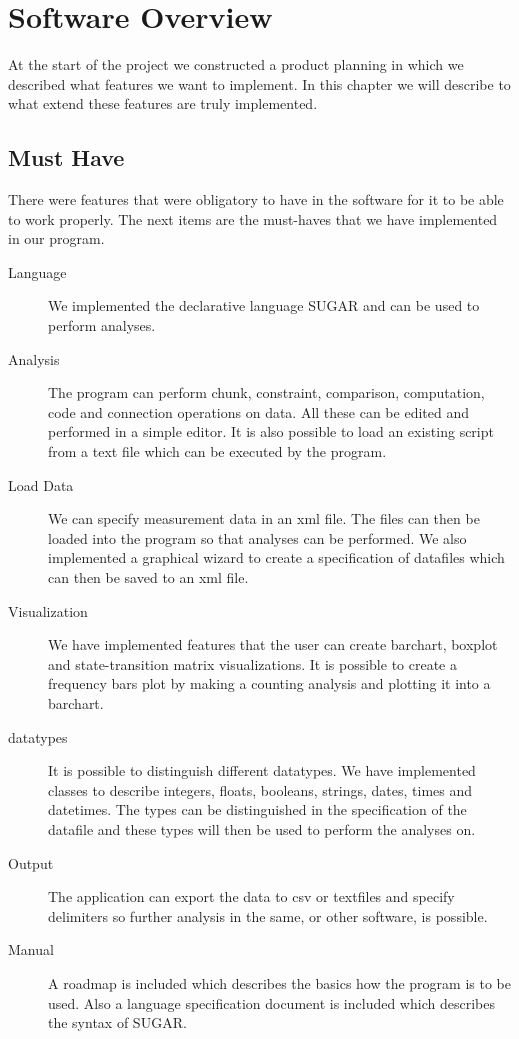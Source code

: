 \chapter{Software Overview} %
At the start of the project we constructed a product planning in which we described what features we want to implement. In this chapter we will describe to what extend these features are truly implemented.

\section{Must Have}
There were features that were obligatory to have in the software for it to be able to work properly. The next items are the must-haves that we have implemented in our program.
\begin{description}

\item[Language] We implemented the declarative language SUGAR and can be used to perform analyses. 

\item[Analysis] The program can perform chunk, constraint, comparison, computation, code and connection operations on data. All these can be edited and performed in a simple editor. It is also possible to load an existing script from a text file which can be executed by the program.

\item[Load Data] We can specify measurement data in an xml file. The files can then be loaded into the program so that analyses can be performed.  We also implemented a graphical wizard to create a specification of datafiles which can then be saved to an xml file.

\item[Visualization] We have implemented features that the user can create barchart, boxplot and state-transition matrix visualizations. It is possible to create a frequency bars plot  by making a counting analysis and plotting it into a barchart.

\item[datatypes] It is possible to distinguish different datatypes. We have implemented classes to describe integers, floats, booleans, strings, dates, times and datetimes. The types can be distinguished in the specification of the datafile and these types will then be used to perform the analyses on.

\item[Output] The application can export the data to csv or textfiles and specify delimiters so further analysis in the same, or other software, is possible.

\item[Manual] A roadmap is included which describes the basics how the program is to be used. Also a language specification document is included which describes the syntax of SUGAR.

\end{description}


